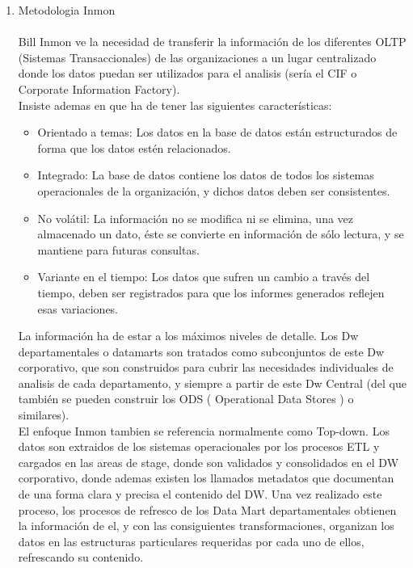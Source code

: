 \documentclass[preprint,12pt]{elsarticle}
\begin{document}
\begin{enumerate}[3.1]
    \item Metodologia Inmon \\
\\
Bill Inmon ve la necesidad de transferir la información de los diferentes OLTP (Sistemas Transaccionales) de las organizaciones a un lugar centralizado donde los datos puedan ser utilizados para el analisis (sería el CIF o Corporate Information Factory).\\
 Insiste ademas en que ha de tener las siguientes características:
\begin{itemize}
		\item Orientado a temas: Los datos en la base de datos están estructurados de forma que los datos estén relacionados.
		\item Integrado: La base de datos contiene los datos de todos los sistemas operacionales de la organización, y dichos datos deben ser consistentes.
		\item No volátil: La información no se modifica ni se elimina, una vez almacenado un dato, éste se convierte en información de sólo lectura, y se mantiene para futuras consultas.
		\item Variante en el tiempo: Los datos que sufren un cambio a través del tiempo, deben ser registrados para que los informes generados reflejen esas variaciones.
\end{itemize}

La información ha de estar a los máximos niveles de detalle. Los Dw departamentales o datamarts son tratados como subconjuntos de este Dw corporativo, que son construidos para cubrir las necesidades individuales de analisis de cada departamento, y siempre a partir de este Dw Central (del que también se pueden construir los ODS ( Operational Data Stores ) o similares).\\


El enfoque Inmon tambien se referencia normalmente como Top-down. Los datos son extraidos de los sistemas operacionales por los procesos ETL y cargados en las areas de stage, donde son validados y consolidados en el DW corporativo, donde ademas existen los llamados metadatos que documentan de una forma clara y precisa el contenido del DW. Una vez realizado este proceso, los procesos de refresco de los Data Mart departamentales obtienen la información de el, y con las consiguientes transformaciones, organizan los datos en las estructuras particulares requeridas por cada uno de ellos, refrescando su contenido.\\


\end{enumerate}
\end{document}
